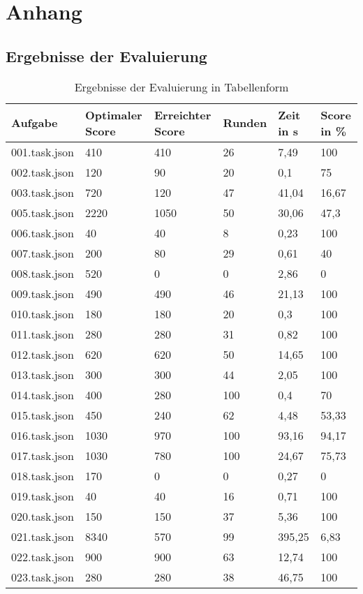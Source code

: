 \section{Anhang}

\subsection{Ergebnisse der Evaluierung}\label{cap:statistik}

\begin{table}[htp]
	\begin{center}
		\begin{tabular}{ | l | l | l | l | l | l |} 
\hline
\textbf{Aufgabe}&	\textbf{Optimaler Score}&	\textbf{Erreichter Score}&	\textbf{Runden}&	\textbf{Zeit in s}& \textbf{Score in \%}\\\hline		
001.task.json&	410&	410&	26&	7,49&		100\\\hline
002.task.json&	120&	90&	20&	0,1&		75\\\hline
003.task.json&	720&	120&	47&	41,04&		16,67\\\hline
005.task.json&	2220&	1050&	50&	30,06&		47,3\\\hline
006.task.json&	40&	40&	8&	0,23&		100\\\hline
007.task.json&	200&	80&	29&	0,61&		40\\\hline
008.task.json&	520&	0&	0&	2,86&		0\\\hline
009.task.json&	490&	490&	46&	21,13&		100\\\hline
010.task.json&	180&	180&	20&	0,3	&	100\\\hline
011.task.json&	280&	280&	31&	0,82&		100\\\hline
012.task.json&	620&	620&	50&	14,65&		100\\\hline
013.task.json&	300&	300&	44&	2,05&		100\\\hline
014.task.json&	400&	280&	100&	0,4&		70\\\hline
015.task.json&	450&	240&	62&	4,48&		53,33\\\hline
016.task.json&	1030&	970&	100&	93,16&		94,17\\\hline
017.task.json&	1030&	780&	100&	24,67&		75,73\\\hline
018.task.json&	170&	0&	0&	0,27&		0\\\hline
019.task.json&	40&	40&	16&	0,71&		100\\\hline
020.task.json&	150&	150&	37&	5,36&		100\\\hline
021.task.json&	8340&	570&	99&	395,25&		6,83\\\hline
022.task.json&	900&	900&	63&	12,74&		100\\\hline
023.task.json&	280&	280&	38&	46,75&		100\\\hline
\end{tabular}
\caption{Ergebnisse der Evaluierung in Tabellenform}
\end{center}
\end{table}


